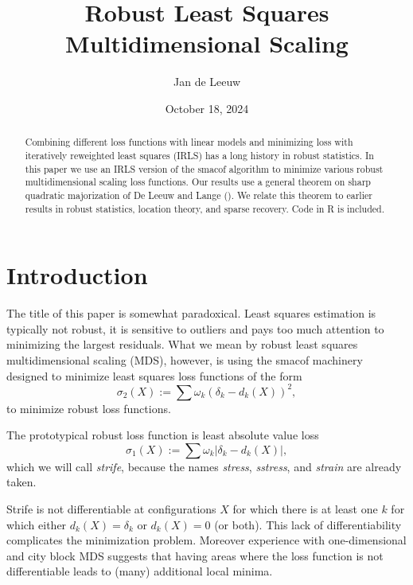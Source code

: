 \documentclass[
  12pt,
  letterpaper,
  DIV=11,
  numbers=noendperiod]{scrartcl}
\title{Robust Least Squares Multidimensional Scaling}
\author{Jan de Leeuw}
\date{October 18, 2024}
\newcommand{\sectionbreak}{\pagebreak}
\renewcommand*\contentsname{Table of contents}
\newcommand\contentsname{Table of contents}
\theoremstyle{definition}
\theoremstyle{plain}
\theoremstyle{plain}
\theoremstyle{remark}
\begin{document}
\maketitle
\begin{abstract}
Combining different loss functions with linear models and minimizing
loss with iteratively reweighted least squares (IRLS) has a long history
in robust statistics. In this paper we use an IRLS version of the smacof
algorithm to minimize various robust multidimensional scaling loss
functions. Our results use a general theorem on sharp quadratic
majorization of De Leeuw and Lange
(). We relate this theorem to
earlier results in robust statistics, location theory, and sparse
recovery. Code in R is included.
\end{abstract}

\renewcommand*\contentsname{Table of contents}
{
\hypersetup{linkcolor=}
\setcounter{tocdepth}{3}
\tableofcontents
}

\sectionbreak

\listoffigures

\sectionbreak

\section{Introduction}\label{introduction}

The title of this paper is somewhat paradoxical. Least squares
estimation is typically not robust, it is sensitive to outliers and pays
too much attention to minimizing the largest residuals. What we mean by
robust least squares multidimensional scaling (MDS), however, is using
the smacof machinery designed to minimize least squares loss functions
of the form \begin{equation}
\sigma_2(X):=\sum \omega_k(\delta_k-d_k(X))^2\label{eq:stressdef},
\end{equation} to minimize robust loss functions.

The prototypical robust loss function is least absolute value loss
\begin{equation}
\sigma_1(X):=\sum \omega_k|\delta_k-d_k(X)|\label{eq:stradddef},
\end{equation} which we will call \emph{strife}, because the names
\emph{stress}, \emph{sstress}, and \emph{strain} are already taken.

Strife is not differentiable at configurations \(X\) for which there is
at least one \(k\) for which either \(d_k(X)=\delta_k\) or \(d_k(X)=0\)
(or both). This lack of differentiability complicates the minimization
problem. Moreover experience with one-dimensional and city block MDS
suggests that having areas where the loss function is not differentiable
leads to (many) additional local minima.
\end{document}
